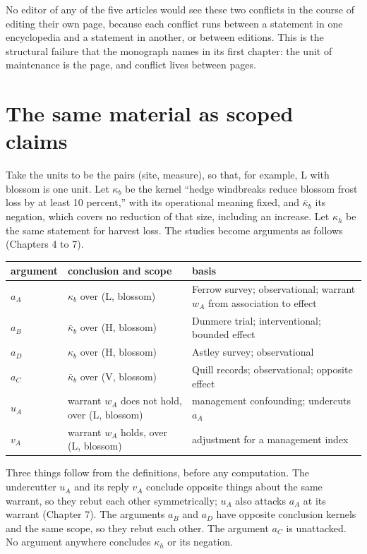 \documentclass[11pt]{article}
\begin{document}
No editor of any of the five articles would see these two conflicts in the course of editing their own page, because each conflict runs between a statement in one encyclopedia and a statement in another, or between editions. This is the structural failure that the monograph names in its first chapter: the unit of maintenance is the page, and conflict lives between pages.

\section{The same material as scoped claims}\label{sec:claims}

Take the units to be the pairs (site, measure), so that, for example, L with blossom is one unit. Let $\kappa_b$ be the kernel ``hedge windbreaks reduce blossom frost loss by at least 10 percent,'' with its operational meaning fixed, and $\bar\kappa_b$ its negation, which covers no reduction of that size, including an increase. Let $\kappa_h$ be the same statement for harvest loss. The studies become arguments as follows (Chapters 4 to 7).

\begin{center}
\small
\begin{tabularx}{\textwidth}{@{}l X l@{}}
\toprule
argument & conclusion and scope & basis\\
\midrule
$a_A$ & $\kappa_b$ over (L, blossom) & Ferrow survey; observational; warrant $w_A$ from association to effect\\
$a_B$ & $\bar\kappa_b$ over (H, blossom) & Dunmere trial; interventional; bounded effect\\
$a_D$ & $\kappa_b$ over (H, blossom) & Astley survey; observational\\
$a_C$ & $\bar\kappa_b$ over (V, blossom) & Quill records; observational; opposite effect\\
$u_A$ & warrant $w_A$ does not hold, over (L, blossom) & management confounding; undercuts $a_A$\\
$v_A$ & warrant $w_A$ holds, over (L, blossom) & adjustment for a management index\\
\bottomrule
\end{tabularx}
\end{center}

Three things follow from the definitions, before any computation. The undercutter $u_A$ and its reply $v_A$ conclude opposite things about the same warrant, so they rebut each other symmetrically; $u_A$ also attacks $a_A$ at its warrant (Chapter 7). The arguments $a_B$ and $a_D$ have opposite conclusion kernels and the same scope, so they rebut each other. The argument $a_C$ is unattacked. No argument anywhere concludes $\kappa_h$ or its negation.
\end{document}
